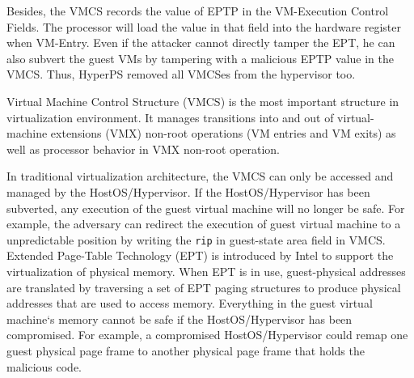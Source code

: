 Besides, the VMCS records the value of EPTP in the VM-Execution Control Fields. The processor will load the value in that field into the hardware register when VM-Entry. 
Even if the attacker cannot directly tamper the EPT, he can also subvert the guest VMs by tampering with a malicious EPTP value in the VMCS. Thus, HyperPS removed all VMCSes from the hypervisor too. 

Virtual Machine Control Structure (VMCS) is the most important structure in virtualization environment. It manages transitions into and out of virtual-machine extensions (VMX) non-root operations (VM entries and VM exits) as well as processor behavior in VMX non-root operation. 

In traditional virtualization architecture, the VMCS can only be accessed and managed by the HostOS/Hypervisor.
If the HostOS/Hypervisor has been subverted, any execution of the guest virtual machine will no longer be safe. For example, the adversary can redirect the execution of guest virtual machine to a unpredictable position by writing the \verb|rip| in guest-state area field in VMCS.
Extended Page-Table Technology (EPT) is introduced by Intel to support the virtualization of physical memory.
When EPT is in use, guest-physical addresses are translated by traversing a set of EPT paging structures to produce physical addresses that are used to access memory. Everything in the guest virtual machine`s memory cannot be safe if the HostOS/Hypervisor has been compromised. For example, a compromised HostOS/Hypervisor could remap one guest physical page frame to another physical page frame that holds the malicious code.
\fi

